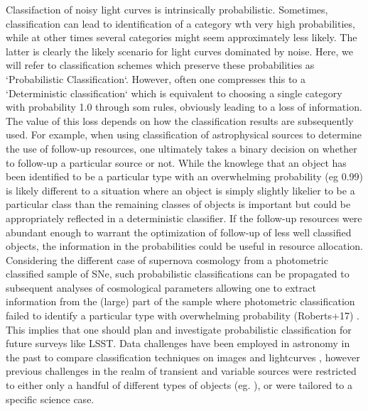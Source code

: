 Classifaction of noisy light curves is intrinsically probabilistic. Sometimes, classification can lead to identification of a category wth very high probabilities, while at other times several categories might seem approximately 
less likely. The latter is clearly the likely scenario for light curves dominated by noise.
Here, we will refer to classification schemes which preserve these probabilities as `Probabilistic Classification`.
However, often one compresses this to a  
 `Deterministic classification` which is equivalent to choosing a single category with probability 1.0 through som 
rules, obviously leading to a loss of information. The value of this loss depends on how the classification results are subsequently used. For example, when using classification of astrophysical sources to determine the use of follow-up resources, one ultimately takes a binary decision on whether to follow-up a particular source or not. While the knowlege that an object has been identified to be a particular type with an overwhelming probability (eg 0.99) is likely different to a situation where an object is simply slightly likelier to be a particular class than the remaining classes of objects is important but could be appropriately reflected in a deterministic classifier. If the follow-up resources were abundant enough to warrant the optimization of follow-up of less well classified objects,  the information in the probabilities could be useful in resource allocation. Considering the different case of supernova cosmology from a photometric classified sample of SNe, such probabilistic classifications can be propagated to subsequent analyses of cosmological parameters allowing one to extract information from the (large) part of the sample where photometric classification failed to identify a particular type with overwhelming probability (Roberts+17) . This implies that one should plan and investigate probabilistic classification for future surveys like LSST. 
Data challenges have been employed in astronomy in the past to compare classification techniques on images  and lightcurves , however previous challenges in the realm of transient and variable sources were restricted to either only a handful of different types of objects (eg. \snphotcc), or were tailored to a specific science case.

